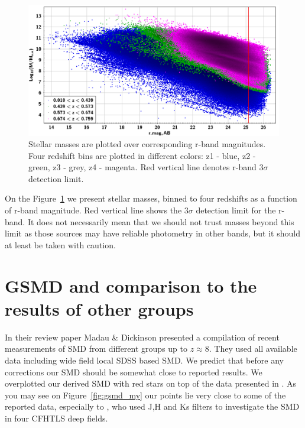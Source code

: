 \begin{figure}[!ht]
\includegraphics[width=6in]{Figures/mass_vs_r-mag.png}
\caption{Stellar masses are plotted over corresponding r-band magnitudes. Four redshift bins are plotted in different colors: z1 - blue, z2 - green, z3 - grey, z4 - magenta. Red vertical line denotes r-band $3\sigma$ detection limit.}
\label{fig:sm_mag_r}
\end{figure}

On the Figure~\ref{fig:sm_mag_r} we present stellar masses, binned to four redshifts as a function of r-band magnitude. Red vertical line shows the $3\sigma$ detection limit for the r-band. It does not necessarily mean that we should not trust masses beyond this limit as those sources may have reliable photometry in other bands, but it should at least be taken with caution.

\section{GSMD and comparison to the results of other groups}

In their review paper Madau \& Dickinson \citep{Madau2014} presented a compilation of recent measurements of SMD from different groups up to $z\approx 8$. They used all available data including wide field local SDSS based SMD. We predict that before any corrections our SMD should be somewhat close to reported results. We overplotted our derived SMD with red stars on top of the data presented in \citep{Madau2014}. As you may see on Figure~\ref{fig:gsmd_my} our points lie very close to some of the reported data, especially to \citep{2012A&A...545A..23B}, who used J,H and Ks filters to investigate the SMD in four CFHTLS deep fields.

